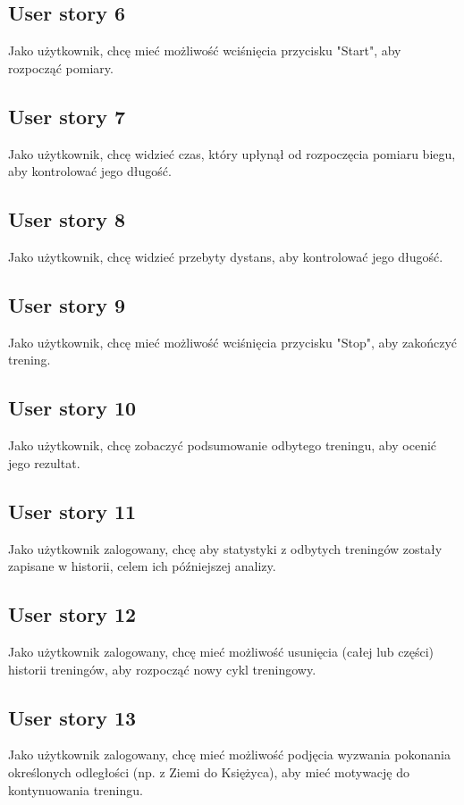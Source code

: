 \documentclass[a4paper]{article}
\begin{document}
\subsection{User story 6}
Jako użytkownik, chcę mieć możliwość wciśnięcia przycisku "Start", aby rozpocząć pomiary.

\subsection{User story 7}
Jako użytkownik, chcę widzieć czas, który upłynął od rozpoczęcia pomiaru biegu, aby kontrolować jego długość.

\subsection{User story 8}
Jako użytkownik, chcę widzieć przebyty dystans, aby kontrolować jego długość.

\subsection{User story 9}
Jako użytkownik, chcę mieć możliwość wciśnięcia przycisku "Stop", aby zakończyć trening.

\subsection{User story 10}
Jako użytkownik, chcę zobaczyć podsumowanie odbytego treningu, aby ocenić jego rezultat.

\subsection{User story 11}
Jako użytkownik zalogowany, chcę aby statystyki z odbytych treningów zostały zapisane w historii, celem ich późniejszej analizy.

\subsection{User story 12}
Jako użytkownik zalogowany, chcę mieć możliwość usunięcia (całej lub części) historii treningów, aby rozpocząć nowy cykl treningowy.

\subsection{User story 13}
Jako użytkownik zalogowany, chcę mieć możliwość podjęcia wyzwania pokonania określonych odległości (np. z Ziemi do Księżyca), aby mieć motywację do kontynuowania treningu.
\end{document}
